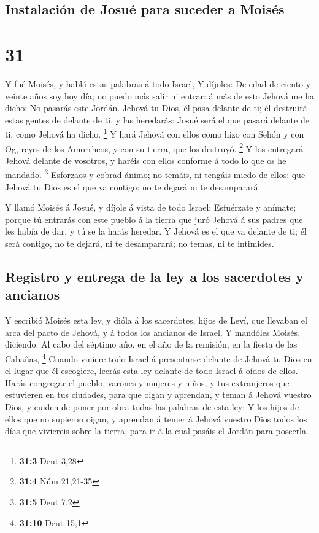 \hypertarget{instalaciuxf3n-de-josuuxe9-para-suceder-a-moisuxe9s}{%
\subsection{Instalación de Josué para suceder a
Moisés}\label{instalaciuxf3n-de-josuuxe9-para-suceder-a-moisuxe9s}}

\hypertarget{section-30}{%
\section{31}\label{section-30}}

 Y fué Moisés, y habló estas palabras á todo Israel,
 Y díjoles: De edad de ciento y veinte años soy hoy día; no
puedo más salir ni entrar: á más de esto Jehová me ha dicho: No pasarás
este Jordán.  Jehová tu Dios, él pasa delante de ti; él
destruirá estas gentes de delante de ti, y las heredarás: Josué será el
que pasará delante de ti, como Jehová ha dicho. \footnote{\textbf{31:3}
  Deut 3,28}  Y hará Jehová con ellos como hizo con Sehón y
con Og, reyes de los Amorrheos, y con su tierra, que los destruyó.
\footnote{\textbf{31:4} Núm 21,21-35}  Y los entregará
Jehová delante de vosotros, y haréis con ellos conforme á todo lo que os
he mandado. \footnote{\textbf{31:5} Deut 7,2}  Esforzaos y
cobrad ánimo; no temáis, ni tengáis miedo de ellos: que Jehová tu Dios
es el que va contigo: no te dejará ni te desamparará.

 Y llamó Moisés á Josué, y díjole á vista de todo Israel:
Esfuérzate y anímate; porque tú entrarás con este pueblo á la tierra que
juró Jehová á sus padres que les había de dar, y tú se la harás heredar.
 Y Jehová es el que va delante de ti; él será contigo, no te
dejará, ni te desamparará; no temas, ni te intimides.

\hypertarget{registro-y-entrega-de-la-ley-a-los-sacerdotes-y-ancianos}{%
\subsection{Registro y entrega de la ley a los sacerdotes y
ancianos}\label{registro-y-entrega-de-la-ley-a-los-sacerdotes-y-ancianos}}

 Y escribió Moisés esta ley, y dióla á los sacerdotes, hijos
de Leví, que llevaban el arca del pacto de Jehová, y á todos los
ancianos de Israel.  Y mandóles Moisés, diciendo: Al cabo
del séptimo año, en el año de la remisión, en la fiesta de las Cabañas,
\footnote{\textbf{31:10} Deut 15,1}  Cuando viniere todo
Israel á presentarse delante de Jehová tu Dios en el lugar que él
escogiere, leerás esta ley delante de todo Israel á oídos de ellos.
 Harás congregar el pueblo, varones y mujeres y niños, y
tus extranjeros que estuvieren en tus ciudades, para que oigan y
aprendan, y teman á Jehová vuestro Dios, y cuiden de poner por obra
todas las palabras de esta ley:  Y los hijos de ellos que
no supieron oigan, y aprendan á temer á Jehová vuestro Dios todos los
días que viviereis sobre la tierra, para ir á la cual pasáis el Jordán
para poseerla.

